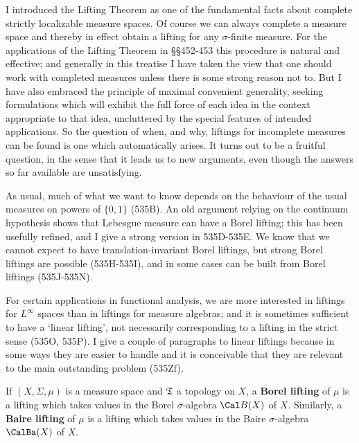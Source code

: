 
\def\chaptername{Topologies and measures III}
\def\sectionname{Liftings}


I introduced the Lifting Theorem as one of the
fundamental facts
about complete strictly localizable measure spaces.   Of course we can
always complete a measure space and thereby in effect obtain a lifting
for any $\sigma$-finite measure.   For the applications of the Lifting
Theorem in \S\S452-453 this procedure is natural and effective;  and
generally in this treatise I have taken the view that one should work
with completed measures unless there is some strong reason not to.   But
I have also embraced the principle of maximal convenient generality,
seeking formulations which will exhibit the full force of each idea in
the context appropriate to that idea, uncluttered by the special
features of intended applications.   So the question of when, and why,
liftings for incomplete measures can be found is one which automatically
arises.   It turns out to be a fruitful question, in the sense that it
leads us to new arguments, even though the answers so far available are
unsatisfying.

As usual, much of what we want to know depends on the behaviour of the
usual measures on powers of $\{0,1\}$ (535B).   An old argument relying
on the continuum hypothesis shows that Lebesgue measure can have a Borel
lifting;  this has been usefully refined, and I give a strong version in
535D-535E.
We know that we cannot expect to have translation-invariant Borel
liftings, but strong Borel liftings are possible
(535H-535I), and in some cases can be built from Borel liftings
(535J-535N).   %

For certain applications in functional analysis, we are more interested
in liftings for $L^{\infty}$ spaces than in liftings for measure algebras;
and it is sometimes sufficient to have a `linear lifting', not
necessarily corresponding to a lifting in the strict sense (535O,
535P).   I give a couple of paragraphs to linear liftings because in
some ways they are easier to handle and it is conceivable that they are
relevant to the main outstanding problem (535Zf).

If $(X,\Sigma,\mu)$ is a measure space and $\frak T$ a topology on $X$,
 a {\bf Borel lifting} of $\mu$ is a lifting which takes
values in the Borel $\sigma$-algebra $\Cal B(X)$ of $X$.      Similarly, a {\bf Baire lifting} of $\mu$ is a lifting
which takes values in the Baire $\sigma$-algebra $\CalBa(X)$ of $X$.


